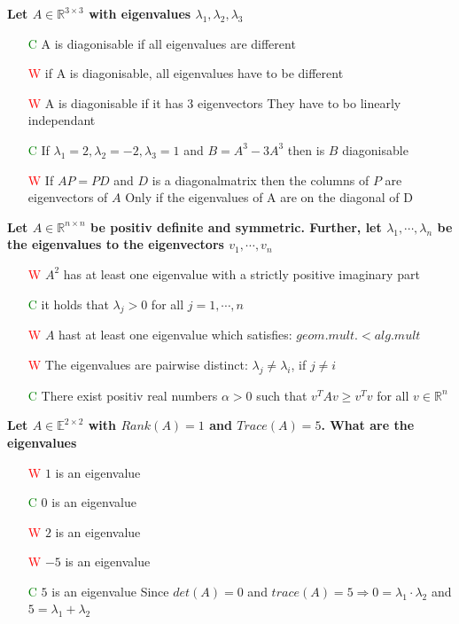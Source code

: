 \documentclass[7pt,landscape, margin = 0.1mm]{article}
\begin{document}
\begin{multicols}{4}
\begin{flushleft}
\begin{itemize}
\end{itemize}
\hspace{3mm} 

\textbf{Let $A  \in \mathbb{R}^{3 \times 3} $ with eigenvalues $\lambda_1, \lambda_2, \lambda_3$}
\begin{itemize}
\item[\textcolor{green}{C}] A is diagonisable if all eigenvalues are different
\item[\textcolor{red}{W}] if A is diagonisable, all eigenvalues have to be different
\item[\textcolor{red}{W}] A is diagonisable if it has 3 eigenvectors
\textcolor{Emerald}{They have to bo linearly independant}
\item[\textcolor{green}{C}]If $\lambda_1 =2, \lambda_2=-2, \lambda_3=1$ and $B=A^3-3A^3$ then is $B$ diagonisable
\item[\textcolor{red}{W}] If $AP=PD$ and $D$ is a diagonalmatrix then the columns of $P$ are eigenvectors of $A$
\textcolor{Emerald}{Only if the eigenvalues of A are on the diagonal of D}
\end{itemize}

\hspace{3mm}


\textbf{Let $A  \in \mathbb{R}^{n \times n} $ be positiv definite and symmetric. Further, let $\lambda_1 , \cdots , \lambda_n $ be the eigenvalues to the eigenvectors  $ v_1 , \cdots ,  v_n$}
\begin{itemize}
\item[\textcolor{red}{W}] $A^2$ has at least one eigenvalue with a strictly positive imaginary part
\item[\textcolor{green}{C}] it holds that $\lambda_j > 0$ for all  $j = 1, \cdots, n $ 
\item[\textcolor{red}{W}] $A$ hast at least one eigenvalue which satisfies: $geom. mult. < alg. mult $
\item[\textcolor{red}{W}] The eigenvalues are pairwise distinct: $\lambda_j \neq \lambda_i $, if $j \neq  i $
\item[\textcolor{green}{C}] There exist positiv real numbers $\alpha > 0 $ such that $v^TAv \geq v^Tv$ for all  $v \in \mathbb{R}^{n} $
\end{itemize}


\textbf{Let $A  \in \mathbb{E}^{2 \times 2} $ with $Rank(A) = 1$ and $Trace(A)=5$. What are the eigenvalues  }
\begin{itemize}
\item[\textcolor{red}{W}] $1$ is an eigenvalue
\item[\textcolor{green}{C}]  $0$ is an eigenvalue
\item[\textcolor{red}{W}] $2$ is an eigenvalue
\item[\textcolor{red}{W}] $-5$ is an eigenvalue
\item[\textcolor{green}{C}]  $5$ is an eigenvalue
\textcolor{Emerald}{Since $det(A)=0 $ and $trace(A)=5 \Rightarrow 0= \lambda_1 \cdot \lambda_2 $ and $5=\lambda_1 + \lambda_2$  } 
\end{itemize}




\end{flushleft}
\end{multicols}
\end{document}
